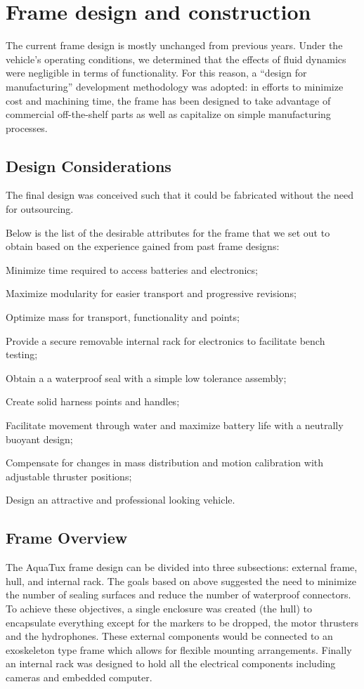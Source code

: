 \section{Frame design and construction}
The current frame design is mostly unchanged from previous years.
Under the vehicle's operating conditions, we determined that the effects
of fluid dynamics were negligible in terms of functionality.  For this
reason, a ``design for manufacturing'' development methodology was
adopted: in efforts to minimize cost and machining time, the frame has been
designed to take advantage of commercial off-the-shelf parts as
well as capitalize on simple manufacturing processes.

\subsection{Design Considerations}
\label{fobjectives}
The final design was conceived such that it could be fabricated
without the need for outsourcing.

Below is the list of the desirable attributes for the frame that we set out to
obtain based on the experience gained from past frame designs:
\begin{packed_enum}
\item Minimize time required to access batteries and electronics;
\item Maximize modularity for easier transport and progressive revisions;
\item Optimize mass for transport, functionality and points;
\item Provide a secure removable internal rack for electronics to facilitate bench testing;
\item Obtain a a waterproof seal with a simple low tolerance assembly;
\item Create solid harness points and handles;
\item Facilitate movement through water and maximize battery life with
  a neutrally buoyant design;
\item Compensate for changes in mass distribution and motion
  calibration with adjustable thruster positions;
\item Design an attractive and professional looking vehicle.
\end{packed_enum}

\subsection{Frame Overview}
The AquaTux frame design can be divided into three
subsections: external frame, hull, and internal rack.  The goals based
on above suggested the need to
minimize the number of sealing surfaces and reduce the number of
waterproof connectors.  To achieve these objectives, a single enclosure
was created (the hull) to encapsulate everything except for the
markers to be dropped, the motor thrusters and the hydrophones.  These external components would be
connected to an exoskeleton type frame which allows for flexible
mounting arrangements.  Finally an internal rack was designed to hold
 all the electrical components including cameras and embedded computer.

